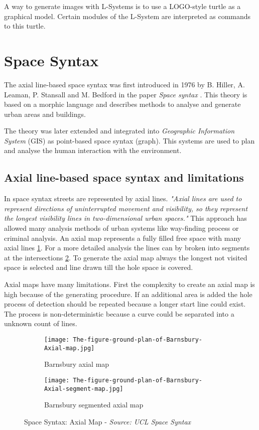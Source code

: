 A way to generate images with L-Systems is to use a LOGO-style turtle as a graphical model. Certain modules of the L-System are interpreted as commands to this turtle.

\pagebreak
\section{Space Syntax} \label{sec:space_syntax}
The axial line-based space syntax was first introduced in 1976 by B. Hiller, A. Leaman, P. Stansall and M. Bedford in the paper \textit{Space syntax} \citep{spaceSyntax:1976}. This theory is based on a morphic language and describes methods to analyse and generate urban areas and buildings.

The theory was later extended and integrated into \textit{Geographic Information System} (GIS) as point-based space syntax (graph). This systems are used to plan and analyse the human interaction with the environment.

\subsection{Axial line-based space syntax and limitations}
In space syntax streets are represented by axial lines. 
\textit{"Axial lines are used to represent directions of uninterrupted movement and visibility, so they represent the longest visibility lines in two-dimensional urban spaces."} \citep{integrationSpaceSyntaxGIS:2002}
This approach has allowed many analysis methods of urban systems like way-finding process or criminal analysis. An axial map represents a fully filled free space with many axial lines \ref{fig:barnsbury_axial_map}. For a more detailed analysis the lines can by broken into segments at the intersections \ref{fig:barnsbury_segmented_axial_map}. To generate the axial map always the longest not visited space is selected and line drawn till the hole space is covered.

Axial maps have many limitations. First the complexity to create an axial map is high because of the generating procedure. If an additional area is added the hole process of detection should be repeated because a longer start line could exist. The process is non-deterministic because a curve could be separated into a unknown count of lines.

\begin{figure}[ht]
    \centering
    \begin{subfigure}[b]{0.4\textwidth}
        \texttt{[image: The-figure-ground-plan-of-Barnsbury-Axial-map.jpg]}
        \caption{Barnsbury axial map}
        \label{fig:barnsbury_axial_map}
    \end{subfigure}
    \quad
    \begin{subfigure}[b]{0.4\textwidth}
        \texttt{[image: The-figure-ground-plan-of-Barnsbury-Axial-segment-map.jpg]}
        \caption{Barnsbury segmented axial map}
        \label{fig:barnsbury_segmented_axial_map}
    \end{subfigure}
    \caption{Space Syntax: Axial Map - \textit{Source: UCL Space Syntax \citep{SpaceSyntaxExampels}}}
    \label{fig:SpaceSyntaxAxialMap}
\end{figure}

